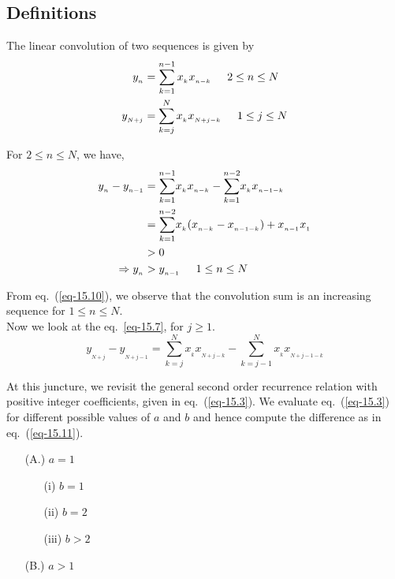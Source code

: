 \begin{multicols}{2}
\subsection{Definitions}\label{subsection-15.2}
The linear convolution of two sequences is given by
\begin{align}
y_{_n} &= \displaystyle{\sum_{k=1}^{n-1}x_{_k} x_{_{n-k}}} \hspace{0.2in} 2 \leq n\leq N\label{eq-15.6}\\
y_{_{N+j}} &= \displaystyle{\sum_{k=j}^{N}x_{_k} x_{_{N+j-k}}} \hspace{0.2in} 1 \leq j \leq N\label{eq-15.7}
\end{align}

For $2\leq n \leq N$, we have,
\begin{align}
y_{_n} - y_{_{n-1}} &= \displaystyle{\sum_{k=1}^{n-1}}x_{_k}x_{_{n-k}} -  \displaystyle{\sum_{k=1}^{n-2}}x_{_k}x_{_{n-1-k}}\label{eq-15.8}\\
&= \displaystyle{\sum_{k=1}^{n-2}}x_{_k} (x_{_{n-k}}-x_{_{n-1-k}} )+ x_{_{n-1}}x_{_1}\label{eq-15.9}\\
& >  0 \nonumber\\
\Rightarrow y_{_n} &> y_{_{n-1}} \hspace{0.2in} 1\leq n \leq N\label{eq-15.10}
\end{align}

From eq.~(\ref{eq-15.10}), we observe that the convolution sum is an increasing sequence for $1\leq n\leq N$.\\
Now we look at the eq.~\ref{eq-15.7}, for $j\geq 1$. 
\begin{equation}
y_{_{N+j}} - y_{_{N+j-1}} = \displaystyle{\sum_{k=j}^{N}}x_{_{k}}x_{_{N+j-k}} -  \displaystyle{\sum_{k=j-1}^{N}}x_{_k}x_{_{N+j-1-k}}\label{eq-15.11}
\end{equation}

\vspace{-.3cm}

At this juncture, we revisit the general second order recurrence relation with positive integer coefficients, given in eq.~(\ref{eq-15.3}). We evaluate eq.~(\ref{eq-15.3}) for different possible values of $a$ and $b$ and hence compute the difference as in eq.~(\ref{eq-15.11}).

\vspace{-.3cm}

\begin{itemize}
\item [\thnum(A.)] $a = 1$ \label{A1}
	\begin{itemize}
	\item [\thnum(i)]  $b = 1$\label{Ai}
	\item [\thnum(ii)] $b = 2$\label{Aii}
	\item [\thnum(iii)]$b > 2$\label{Aiii}
	\end{itemize}
\item [\thnum(B.)] $a >1$\label{ag2}
\end{itemize}



\end{multicols}
